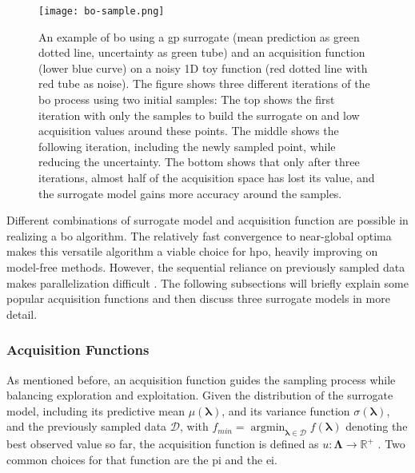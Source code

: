 \begin{figure}[h]
	\centering
	\texttt{[image: bo-sample.png]}
	\caption[An example of \gls{bo} using a \gls{gp} surrogate]{An example of \gls{bo} using a \gls{gp} surrogate (mean prediction as green dotted line, uncertainty as green tube) and an acquisition function (lower blue curve) on a noisy 1D toy function (red dotted line with red tube as noise).
		The figure shows three different iterations of the \gls{bo} process using two initial samples: The top shows the first iteration with only the samples to build the surrogate on and low acquisition values around these points. The middle shows the following iteration, including the newly sampled point, while reducing the uncertainty. The bottom shows that only after three iterations, almost half of the acquisition space has lost its value, and the surrogate model gains more accuracy around the samples.}
	\label{fig:bo-sample}
\end{figure}

Different combinations of surrogate model and acquisition function are possible in realizing a \gls{bo} algorithm. The relatively fast convergence to near-global optima makes this versatile algorithm a viable choice for \gls{hpo}, heavily improving on model-free methods. However, the sequential reliance on previously sampled data makes parallelization difficult \cite{yang2020hyperparameter}.
The following subsections will briefly explain some popular acquisition functions and then discuss three surrogate models in more detail.

\subsubsection{Acquisition Functions}

As mentioned before, an acquisition function guides the sampling process while balancing exploration and exploitation. Given the distribution of the surrogate model, including its predictive mean $\mu(\mathbf{\lambda})$, and its variance function $\sigma(\mathbf{\lambda})$, and the previously sampled data $\mathcal{D}$, with $f_{min} = \operatorname*{argmin}_{\mathbf{\lambda}\in \mathcal{D}} f(\mathbf{\lambda})$ denoting the best observed value so far, the acquisition function is defined as $u: \mathbf{\Lambda} \to \mathbb{R}^+$ \cite{snoek2012practical}. Two common choices for that function are the \gls{pi} and the \gls{ei}.

